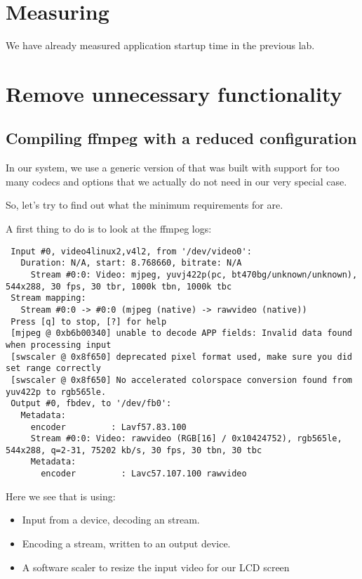 
\section{Measuring}

We have already measured application startup time in the previous lab.

\section{Remove unnecessary functionality}

\subsection{Compiling ffmpeg with a reduced configuration}

In our system, we use a generic version of  that was built
with support for too many codecs and options that we actually do not
need in our very special case.

So, let's try to find out what the minimum requirements for
 are.

A first thing to do is to look at the {\code ffmpeg} logs:

\begin{verbatim}
 Input #0, video4linux2,v4l2, from '/dev/video0':
   Duration: N/A, start: 8.768660, bitrate: N/A
     Stream #0:0: Video: mjpeg, yuvj422p(pc, bt470bg/unknown/unknown), 544x288, 30 fps, 30 tbr, 1000k tbn, 1000k tbc
 Stream mapping:
   Stream #0:0 -> #0:0 (mjpeg (native) -> rawvideo (native))
 Press [q] to stop, [?] for help
 [mjpeg @ 0xb6b00340] unable to decode APP fields: Invalid data found when processing input
 [swscaler @ 0x8f650] deprecated pixel format used, make sure you did set range correctly
 [swscaler @ 0x8f650] No accelerated colorspace conversion found from yuv422p to rgb565le.
 Output #0, fbdev, to '/dev/fb0':
   Metadata:
     encoder         : Lavf57.83.100
     Stream #0:0: Video: rawvideo (RGB[16] / 0x10424752), rgb565le, 544x288, q=2-31, 75202 kb/s, 30 fps, 30 tbn, 30 tbc
     Metadata:
       encoder         : Lavc57.107.100 rawvideo
\end{verbatim}

Here we see that  is using:
\begin{itemize}
\item Input from a  device, decoding an 
stream.
\item Encoding a  stream, written to an
 output device.
\item A software scaler to resize the input video for our LCD screen
\end{itemize}

